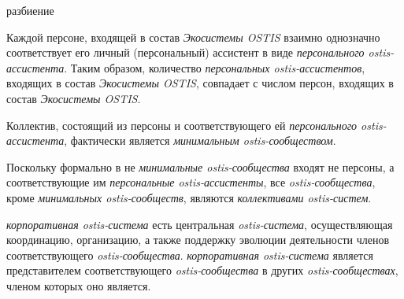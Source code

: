 \begin{SCn}
\begin{scnrelfromset}{разбиение}
\end{scnrelfromset}
\end{SCn}

Каждой персоне, входящей в состав \textit{Экосистемы OSTIS} взаимно однозначно соответствует его личный (персональный) ассистент в виде \textit{персонального ostis-ассистента}.
Таким образом, количество \textit{персональных ostis-ассистентов}, входящих в состав \textit{Экосистемы OSTIS}, совпадает с числом персон, входящих в состав \textit{Экосистемы OSTIS}.


Коллектив, состоящий из персоны и соответствующего ей \textit{персонального ostis-ассистента}, фактически является \textit{минимальным ostis-сообществом}.


Поскольку формально в не \textit{минимальные ostis-сообщества} входят не персоны, а соответствующие им \textit{персональные ostis-ассистенты}, все \textit{ostis-сообщества}, кроме \textit{минимальных ostis-сообществ}, являются \textit{коллективами ostis-систем}.

\textit{корпоративная ostis-система} есть центральная \textit{ostis-система}, осуществляющая координацию, организацию, а также поддержку эволюции деятельности членов соответствующего \textit{ostis-сообщества}. 
\textit{корпоративная ostis-система} является представителем соответствующего \textit{ostis-сообщества} в других \textit{ostis-сообществах}, членом которых оно является.

